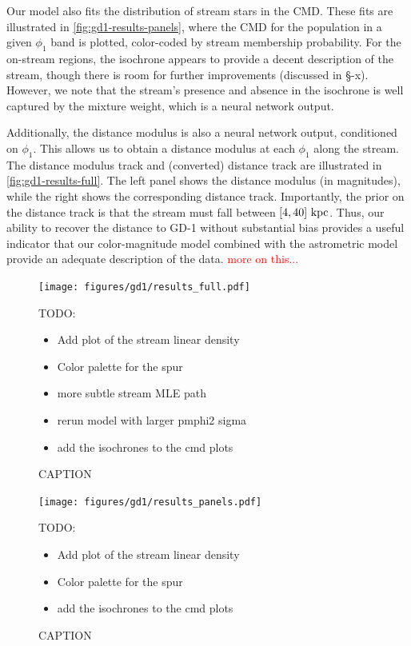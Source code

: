 \documentclass[twocolumn]{aastex631}
\newcommand{\TODO}[1]{{\textcolor{red}{#1}}}
\newcommand{\JN}[1]{\TODO{#1}}
\begin{document}
{        Our model also fits the distribution of stream stars in the CMD. These
        fits are illustrated in \autoref{fig:gd1-results-panels}, where the CMD
        for the population in a given $\phi_1$ band is plotted, color-coded by
        stream membership probability. For the on-stream regions, the isochrone
        appears to provide a decent description of the stream, though there is
        room for further improvements (discussed in \S-x). However, we note that
        the stream's presence and absence in the isochrone is well captured by
        the mixture weight, which is a neural network output. 
        
        Additionally, the distance modulus is also a neural network output,
        conditioned on $\phi_1$. This allows us to obtain a distance modulus at
        each $\phi_1$ along the stream. The distance modulus track and
        (converted) distance track are illustrated in
        \autoref{fig:gd1-results-full}. The left panel shows the distance
        modulus (in magnitudes), while the right shows the corresponding
        distance track. Importantly, the prior on the distance track is that the
        stream must fall between $[4,40]~\rm{kpc}$. Thus, our ability to recover
        the distance to GD-1 without substantial bias provides a useful
        indicator that our color-magnitude model combined with the astrometric
        model provide an adequate description of the data. \JN{more on this...}

        \begin{figure}[h]
            \centering
            \texttt{[image: figures/gd1/results\_full.pdf]}
            \caption{CAPTION}
            TODO:
            \begin{itemize}
                \item Add plot of the stream linear density
                \item Color palette for the spur
                \item more subtle stream MLE path
                \item rerun model with larger pmphi2 sigma
                \item add the isochrones to the cmd plots
            \end{itemize}
            \label{fig:gd1-results-full}
        \end{figure}

        \begin{figure}[h]
            \centering
            \texttt{[image: figures/gd1/results\_panels.pdf]}
            \caption{CAPTION}
            TODO:
            \begin{itemize}
                \item Add plot of the stream linear density
                \item Color palette for the spur
                \item add the isochrones to the cmd plots
            \end{itemize}
            \label{fig:gd1-results-panels}
        \end{figure}

}
\end{document}

